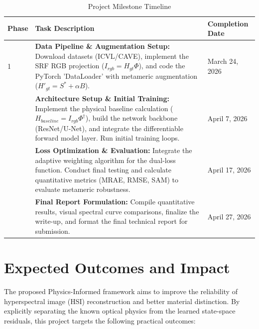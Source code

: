 \documentclass[stu]{apa7}
\begin{document}
\begin{table}[h]
  \centering
  \caption{Project Milestone Timeline}
  \label{tab:Timeline}
  \begin{tabular}{@{}lp{8cm}l@{}} \toprule
  Phase & Task Description & Completion Date \\ \midrule
  1     & \textbf{Data Pipeline \& Augmentation Setup:} Download datasets (ICVL/CAVE), implement the SRF RGB projection ($I_{rgb} = H_{gt} \Phi$), and code the PyTorch 'DataLoader' with metameric augmentation ($H'_{gt} = S^* + \alpha B$). & March 24, 2026 \\ \addlinespace
  2     & \textbf{Architecture Setup \& Initial Training:} Implement the physical baseline calculation ($H_{baseline} = I_{rgb} \Phi^{\dagger}$), build the network backbone (ResNet/U-Net), and integrate the differentiable forward model layer. Run initial training loops. & April 7, 2026 \\ \addlinespace
  3     & \textbf{Loss Optimization \& Evaluation:} Integrate the adaptive weighting algorithm for the dual-loss function. Conduct final testing and calculate quantitative metrics (MRAE, RMSE, SAM) to evaluate metameric robustness. & April 17, 2026 \\ \addlinespace
  4     & \textbf{Final Report Formulation:} Compile quantitative results, visual spectral curve comparisons, finalize the write-up, and format the final technical report for submission. & April 27, 2026 \\ \bottomrule
  \end{tabular}
\end{table}

\section{Expected Outcomes and Impact}

The proposed Physics-Informed framework aims to improve the reliability of hyperspectral image (HSI) reconstruction and better material distinction. By explicitly separating the known optical physics from the learned state-space residuals, this project targets the following practical outcomes:
\end{document}
